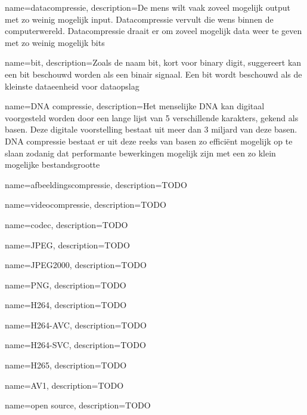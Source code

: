 {
	name={datacompressie},
	description={De mens wilt vaak zoveel mogelijk output met zo weinig mogelijk input. Datacompressie vervult die wens binnen de computerwereld. Datacompressie draait er om zoveel mogelijk data weer te geven met zo weinig mogelijk bits}
}

{
	name={bit},
	description={Zoals de naam bit, kort voor binary digit, suggereert kan een bit beschouwd worden als een binair signaal. Een bit wordt beschouwd als de kleinste dataeenheid voor dataopslag}
}

{
	name={DNA compressie},
	description={Het menselijke DNA kan digitaal voorgesteld worden door een lange lijst van 5 verschillende karakters, gekend als basen. Deze digitale voorstelling bestaat uit meer dan 3 miljard van deze basen. DNA compressie bestaat er uit deze reeks van basen zo efficiënt mogelijk op te slaan zodanig dat performante bewerkingen mogelijk zijn met een zo klein mogelijke bestandsgrootte}
}

{
	name={afbeeldingscompressie},
	description={TODO}
}

{
	name={videocompressie},
	description={TODO}
}

{
	name={codec},
	description={TODO}
}

{
	name={JPEG},
	description={TODO}
}

{
	name={JPEG2000},
	description={TODO}
}

{
	name={PNG},
	description={TODO}
}

{
	name={H264},
	description={TODO}
}

{
	name={H264-AVC},
	description={TODO}
}

{
	name={H264-SVC},
	description={TODO}
}

{
	name={H265},
	description={TODO}
}

{
	name={AV1},
	description={TODO}
}

{
	name={open source},
	description={TODO}
}

